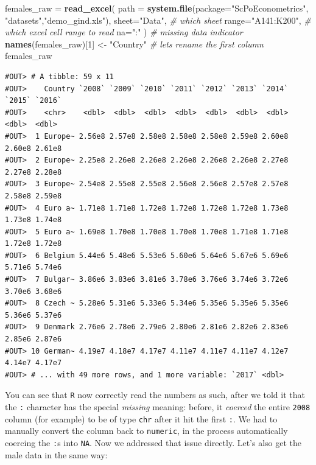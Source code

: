 \documentclass[]{book}
\newenvironment{Shaded}{\begin{snugshade}}{\end{snugshade}}
\newcommand{\CommentTok}[1]{\textcolor[rgb]{0.56,0.35,0.01}{\textit{#1}}}
\newcommand{\DataTypeTok}[1]{\textcolor[rgb]{0.13,0.29,0.53}{#1}}
\newcommand{\DecValTok}[1]{\textcolor[rgb]{0.00,0.00,0.81}{#1}}
\newcommand{\KeywordTok}[1]{\textcolor[rgb]{0.13,0.29,0.53}{\textbf{#1}}}
\newcommand{\NormalTok}[1]{#1}
\newcommand{\StringTok}[1]{\textcolor[rgb]{0.31,0.60,0.02}{#1}}
\begin{document}
\begin{Shaded}
\begin{Highlighting}[]
\NormalTok{females_raw =}\StringTok{ }\KeywordTok{read_excel}\NormalTok{(}
                \DataTypeTok{path =} \KeywordTok{system.file}\NormalTok{(}\DataTypeTok{package=}\StringTok{"ScPoEconometrics"}\NormalTok{,}
                                    \StringTok{"datasets"}\NormalTok{,}\StringTok{"demo_gind.xls"}\NormalTok{), }
                \DataTypeTok{sheet=}\StringTok{"Data"}\NormalTok{, }\CommentTok{# which sheet}
                \DataTypeTok{range=}\StringTok{"A141:K200"}\NormalTok{,  }\CommentTok{# which excel cell range to read}
                \DataTypeTok{na=}\StringTok{":"}\NormalTok{ )   }\CommentTok{# missing data indicator}
\KeywordTok{names}\NormalTok{(females_raw)[}\DecValTok{1}\NormalTok{] <-}\StringTok{ "Country"}   \CommentTok{# lets rename the first column}
\NormalTok{females_raw}
\end{Highlighting}
\end{Shaded}

\begin{verbatim}
#OUT> # A tibble: 59 x 11
#OUT>    Country `2008` `2009` `2010` `2011` `2012` `2013` `2014` `2015` `2016`
#OUT>    <chr>    <dbl>  <dbl>  <dbl>  <dbl>  <dbl>  <dbl>  <dbl>  <dbl>  <dbl>
#OUT>  1 Europe~ 2.56e8 2.57e8 2.58e8 2.58e8 2.58e8 2.59e8 2.60e8 2.60e8 2.61e8
#OUT>  2 Europe~ 2.25e8 2.26e8 2.26e8 2.26e8 2.26e8 2.26e8 2.27e8 2.27e8 2.28e8
#OUT>  3 Europe~ 2.54e8 2.55e8 2.55e8 2.56e8 2.56e8 2.57e8 2.57e8 2.58e8 2.59e8
#OUT>  4 Euro a~ 1.71e8 1.71e8 1.72e8 1.72e8 1.72e8 1.72e8 1.73e8 1.73e8 1.74e8
#OUT>  5 Euro a~ 1.69e8 1.70e8 1.70e8 1.70e8 1.70e8 1.71e8 1.71e8 1.72e8 1.72e8
#OUT>  6 Belgium 5.44e6 5.48e6 5.53e6 5.60e6 5.64e6 5.67e6 5.69e6 5.71e6 5.74e6
#OUT>  7 Bulgar~ 3.86e6 3.83e6 3.81e6 3.78e6 3.76e6 3.74e6 3.72e6 3.70e6 3.68e6
#OUT>  8 Czech ~ 5.28e6 5.31e6 5.33e6 5.34e6 5.35e6 5.35e6 5.35e6 5.36e6 5.37e6
#OUT>  9 Denmark 2.76e6 2.78e6 2.79e6 2.80e6 2.81e6 2.82e6 2.83e6 2.85e6 2.87e6
#OUT> 10 German~ 4.19e7 4.18e7 4.17e7 4.11e7 4.11e7 4.11e7 4.12e7 4.14e7 4.17e7
#OUT> # ... with 49 more rows, and 1 more variable: `2017` <dbl>
\end{verbatim}

You can see that \texttt{R} now correctly read the numbers as such, after we told it that the \texttt{:} character has the special \emph{missing} meaning: before, it \emph{coerced} the entire \texttt{2008} column (for example) to be of type \texttt{chr} after it hit the first \texttt{:}. We had to manually convert the column back to \texttt{numeric}, in the process automatically coercing the \texttt{:}s into \texttt{NA}. Now we addressed that issue directly. Let's also get the male data in the same way:
\end{document}
